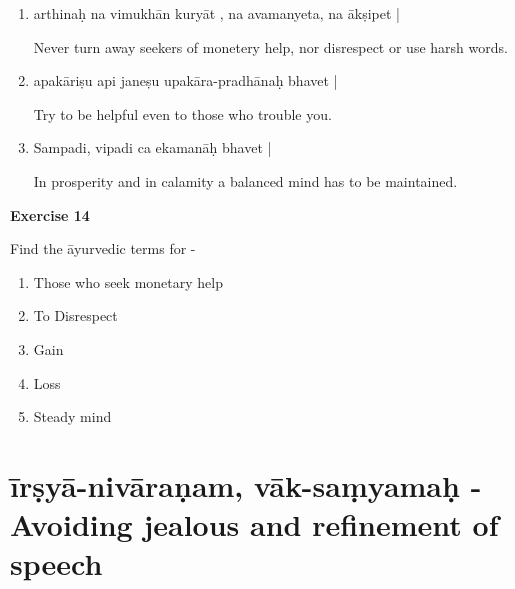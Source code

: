 \begin{enumerate}
\item {}

arthinaḥ na vimukhān kuryāt , na avamanyeta, na ākṣipet |

Never turn away seekers of monetery help, nor disrespect or use harsh words.  

\item {}

apakāriṣu api janeṣu upakāra-pradhānaḥ bhavet | 

Try to be helpful even to those who trouble you. 

\item {}

Sampadi, vipadi ca ekamanāḥ bhavet |

In prosperity and in calamity a balanced mind has to be maintained.
\end{enumerate}

\begin{center}
\textbf{\large Exercise 14}
\end{center}

Find the āyurvedic terms for -

\begin{enumerate}
\renewcommand{\theenumi}{\alph{enumi}}
\renewcommand{\labelenumi}{\theenumi.}
\item Those who seek monetary help
\item To Disrespect
\item Gain
\item Loss
\item Steady mind
\end{enumerate}

\chapter{īrṣyā-nivāraṇam, vāk-saṃyamaḥ - Avoiding jealous and refinement of speech}

